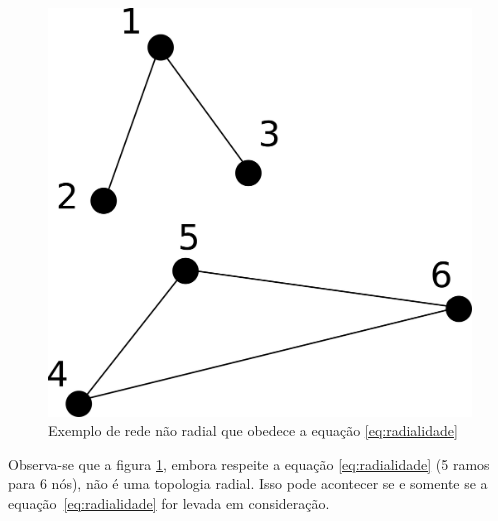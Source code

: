 \begin{figure}[H]
    \centering
    \includegraphics[scale = 0.8]{4_Modeling/restricao_fail.png}
    \caption{Exemplo de rede não radial que obedece a equação \eqref{eq:radialidade}}
    \label{fig:radialidade_wrong}
\end{figure}

Observa-se que a figura \ref{fig:radialidade_wrong}, embora respeite a equação \eqref{eq:radialidade} (5 ramos para 6 nós), não é uma topologia radial. Isso pode acontecer se e somente se a equação~\eqref{eq:radialidade} for levada em consideração.

